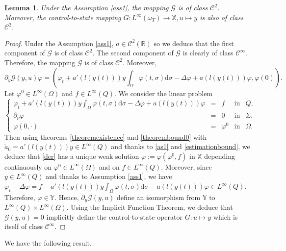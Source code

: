 \documentclass[reqno,twoside]{amsart}
\numberwithin{equation}{section}
\newtheorem{lemma}[theorem]{Lemma}
\theoremstyle{definition}
\numberwithin{equation}{section}
\def \dis {\displaystyle}
\def \R {\mathbb{R}}
\def \d {\mathrm{d}}
\def \R {\mathbb{R}}
\begin{document}
\begin{lemma}\label{lemmeG}
Under the Assumption \ref{ass1}, the mapping $\mathcal{G}$ is of class $\mathcal{C}^{2}$. Moreover, the control-to-state mapping $G:L^\infty(\omega_T)\to\mathbb{ X}, u\mapsto y$ is also of class $\mathcal{C}^{2}$.
\end{lemma}
\begin{proof}
Under the Assumption \ref{ass1}, $a\in \mathcal{C}^2(\R)$ so we deduce that the first component  of $\mathcal{G}$ is of class $\mathcal{C}^2$. The second component of $\mathcal{G}$ is clearly of class $\mathcal{C}^{\infty}$. Therefore, the mapping $\mathcal{G}$ is of class $\mathcal{C}^{2}$.
Moreover,
$$\partial_y\mathcal{G}(y,u)\varphi=\left(\varphi_t+a'(l(y(t)))y\int_{\Omega}\varphi(t,\sigma)\d \sigma-\Delta \varphi+a(l(y(t)))\varphi,\varphi(0)\right).$$
Let $\varphi^0\in L^\infty(\Omega)$ and $f\in L^\infty(Q)$. We consider the linear problem
\begin{equation}\label{der}
	\left\{
	\begin{array}{rllll}
		\dis \varphi_t+a'(l(y(t)))y\int_{\Omega}\varphi(t,\sigma)\d\sigma-\Delta \varphi+a(l(y(t)))\varphi &=& f &\mbox{in}& Q,\\
		\dis \partial_{\nu}\varphi&=&0  &\mbox{in}& \Sigma,\\
		\varphi(0,\cdot)&=& \varphi^0 &\mbox{in}& \Omega.
	\end{array}
	\right.
\end{equation}
Then using theorems \ref{theoremexistence} and \ref{theorembound0} with $\tilde{a}_0=a'(l(y(t)))y\in L^\infty(Q)$ and thanks to \eqref{as1} and \eqref{estimationbound}, we deduce that \eqref{der} has a unique weak solution  $\varphi:=\varphi(\varphi^0,f)$ in $\mathbb{X}$ depending continuously on $\varphi^0\in L^\infty(\Omega)$ and on $f\in L^\infty(Q)$.  Moreover, since $y\in L^\infty(Q)$ and thanks to Assumption \ref{ass1}, we have $ \varphi_t-\Delta \varphi=f-a'(l(y(t)))y\int_{\Omega}\varphi(t,\sigma)\d\sigma-a(l(y(t)))\varphi\in L^\infty(Q)$. Therefore, $\varphi\in \mathbb{ Y}$. Hence,
$\dis \partial_y\mathcal{G}(y,u)$ define an isomorphism from $\mathbb{ Y}$ to $L^\infty(Q)\times L^\infty(\Omega)$. Using the Implicit Function Theorem, we deduce that $\mathcal{G}(y,u)=0$ implicitly define the control-to-state operator $G:u\mapsto y$ which is itself of class  $\mathcal{C}^{\infty}$.
\end{proof}
We have the following result.
\end{document}
